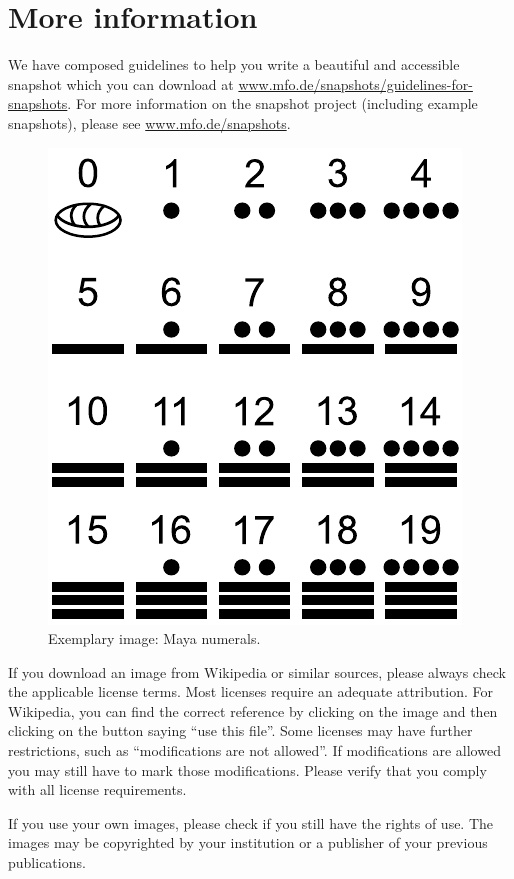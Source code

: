 \documentclass{snapshotmfo}
\begin{document}
\section{More information}
We have composed guidelines to help you write a beautiful and accessible snapshot which you can download at \href{https://www.mfo.de/snapshots/guidelines-for-snapshots}{www.mfo.de/snapshots/guidelines-for-snapshots}. For more information on the snapshot project (including example snapshots), please see \href{https://www.mfo.de/snapshots}{www.mfo.de/snapshots}.

\begin{figure}[ht]
        \centering
        \includegraphics[width= 0.33 \textwidth]{maya.pdf}
        \caption{Exemplary image: Maya numerals.}
\label{fig.maya}
\end{figure}

If you download an image from Wikipedia or similar sources, please always check the applicable license terms. Most licenses require an adequate attribution. For Wikipedia, you can find the correct reference by clicking on the image and then clicking on the button saying ``use this file''. Some licenses may have further restrictions, such as ``modifications are not allowed''. If modifications are allowed you may still have to mark those modifications. Please verify that you comply with all license requirements.

If you use your own images, please check if you still have the rights of use. The images may be copyrighted by your institution or a publisher of your previous publications.

\end{document}
